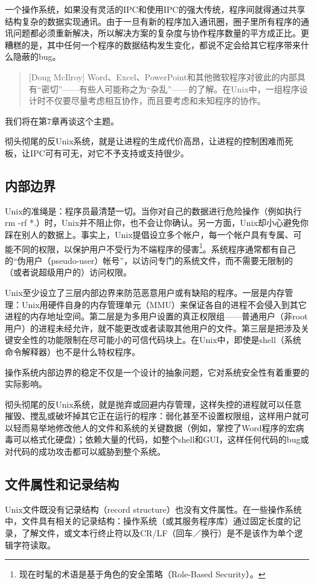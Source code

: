 \documentclass[12pt,oneside]{ctexbook}
\begin{document}
\begin{common-format}
一个操作系统，如果没有灵活的IPC和使用IPC的强大传统，程序间就得通过共享结构复杂的数据实现通讯。由于一旦有新的程序加入通讯圈，圈子里所有程序的通讯问题都必须重新解决，所以解决方案的复杂度与协作程序数量的平方成正比。更糟糕的是，其中任何一个程序的数据结构发生变化，都说不定会给其它程序带来什么隐蔽的bug。

\begin{quote}[Doug McIlroy]
Word、Excel、PowerPoint和其他微软程序对彼此的内部具有“密切”——有些人可能称之为“杂乱”——的了解。在Unix中，一组程序设计时不仅要尽量考虑相互协作，而且要考虑和未知程序的协作。
\end{quote}

我们将在第7章再谈这个主题。

彻头彻尾的反Unix系统，就是让进程的生成代价高昂，让进程的控制困难而死板，让IPC可有可无，对它不予支持或支持很少。

\subsection{内部边界}
Unix的准绳是：程序员最清楚一切。当你对自己的数据进行危险操作（例如执行rm -rf *.）时，Unix并不阻止你，也不会让你确认。另一方面，Unix却小心避免你踩在别人的数据上。事实上，Unix提倡设立多个帐户，每一个帐户具有专属、可能不同的权限，以保护用户不受行为不端程序的侵害\footnote{现在时髦的术语是基于角色的安全策略（Role-Based Security）。}。系统程序通常都有自己的“伪用户（pseudo-user）帐号”，以访问专门的系统文件，而不需要无限制的（或者说超级用户的）访问权限。

Unix至少设立了三层内部边界来防范恶意用户或有缺陷的程序。一层是内存管理：Unix用硬件自身的内存管理单元（MMU）来保证各自的进程不会侵入到其它进程的内存地址空间。第二层是为多用户设置的真正权限组——普通用户（非root用户）的进程未经允许，就不能更改或者读取其他用户的文件。第三层是把涉及关键安全性的功能限制在尽可能小的可信代码块上。在Unix中，即使是shell（系统命令解释器）也不是什么特权程序。

操作系统内部边界的稳定不仅是一个设计的抽象问题，它对系统安全性有着重要的实际影响。

彻头彻尾的反Unix系统，就是抛弃或回避内存管理，这样失控的进程就可以任意摧毁、搅乱或破坏掉其它正在运行的程序：弱化甚至不设置权限组，这样用户就可以轻而易举地修改他人的文件和系统的关键数据（例如，掌控了Word程序的宏病毒可以格式化硬盘）；依赖大量的代码，如整个shell和GUI，这样任何代码的bug或对代码的成功攻击都可以威胁到整个系统。

\subsection{文件属性和记录结构}
Unix文件既没有记录结构（record structure）也没有文件属性。在一些操作系统中，文件具有相关的记录结构：操作系统（或其服务程序库）通过固定长度的记录，了解文件，或文本行终止符以及CR/LF（回车／换行）是不是该作为单个逻辑字符读取。


\end{common-format}
\end{document}
